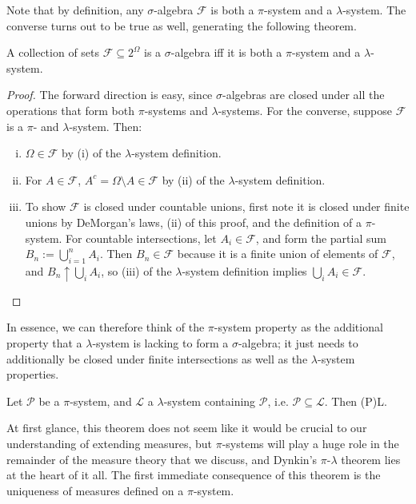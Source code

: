 Note that by definition, any $\sigma$-algebra $\mathcal F$ is both a $\pi$-system and a $\lambda$-system. The converse turns out to be true as well, generating the following theorem.
\begin{theorem}
	A collection of sets $\mathcal F\subseteq 2^\Omega$ is a $\sigma$-algebra iff it is both a $\pi$-system and a $\lambda$-system. 
\end{theorem}
\begin{proof}
	The forward direction is easy, since $\sigma$-algebras are closed under all the operations that form both $\pi$-systems and $\lambda$-systems. For the converse, suppose $\mathcal F$ is a $\pi$- and $\lambda$-system. Then:
	\begin{enumerate}[i)]
		\item $\Omega\in\mathcal F$ by (i) of the $\lambda$-system definition.
		\item For $A\in\mathcal F$, $A^c = \Omega\setminus A\in \mathcal F$ by (ii) of the $\lambda$-system definition.
		\item To show $\mathcal F$ is closed under countable unions, first note it is closed under finite unions by DeMorgan's laws, (ii) of this proof, and the definition of a $\pi$-system. For countable intersections, let $A_i\in\mathcal F$, and form the partial sum $B_n := \bigcup_{i = 1}^n A_i$. Then $B_n\in\mathcal F$ because it is a finite union of elements of $\mathcal F$, and $B_n\uparrow \bigcup_i A_i$, so (iii) of the $\lambda$-system definition implies $\bigcup_i A_i\in\mathcal F$. 
	\end{enumerate}
\end{proof}
In essence, we can therefore think of the $\pi$-system property as the additional property that a $\lambda$-system is lacking to form a $\sigma$-algebra; it just needs to additionally be closed under finite intersections as well as the $\lambda$-system properties. 

\begin{theorem}
	Let $\mathcal P$ be a $\pi$-system, and $\mathcal L$ a $\lambda$-system containing $\mathcal P$, i.e. $\mathcal P\subseteq \mathcal L$. Then
	\eq
		\sigma(\mathcal P)\subseteq\mathcal L.
	\qe
\end{theorem}

At first glance, this theorem does not seem like it would be crucial to our understanding of extending measures, but $\pi$-systems will play a huge role in the remainder of the measure theory that we discuss, and Dynkin's $\pi$-$\lambda$ theorem lies at the heart of it all. The first immediate consequence of this theorem is the uniqueness of measures defined on a $\pi$-system.

